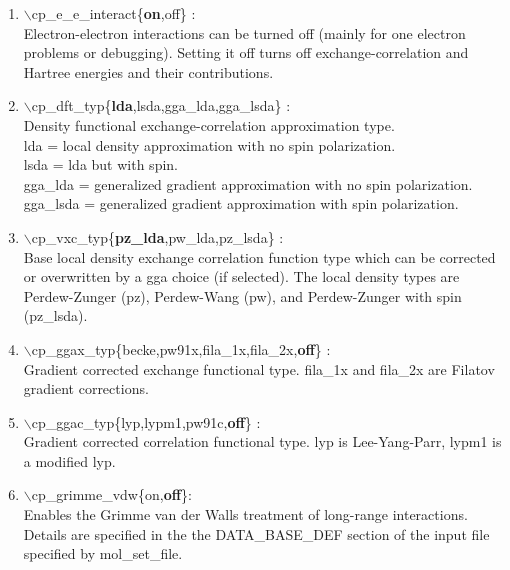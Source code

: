 \documentclass[12pt,titlepage]{article}
\begin{document}
\begin{enumerate}

 \vspace{0.15in} 
 \item  $\backslash$cp\_e\_e\_interact\{{\bf on},off\} : \\
     Electron-electron interactions can be turned off (mainly for  one electron problems or debugging).
     Setting it off turns off exchange-correlation and Hartree energies and their contributions.

 \vspace{0.15in} 
 \item  $\backslash$cp\_dft\_typ\{{\bf lda},lsda,gga\_lda,gga\_lsda\} : \\
     Density functional exchange-correlation approximation type.\\
     lda = local density approximation with no spin polarization.\\
     lsda = lda but with spin.\\
     gga\_lda = generalized gradient approximation with no spin polarization.\\
     gga\_lsda = generalized gradient approximation with  spin polarization.

 \vspace{0.15in} 
 \item  $\backslash$cp\_vxc\_typ\{{\bf pz\_lda},pw\_lda,pz\_lsda\} : \\
     Base local density exchange correlation function type which can be corrected or overwritten by a gga choice (if selected).  The local density types are Perdew-Zunger (pz), Perdew-Wang (pw), and Perdew-Zunger with spin (pz\_lsda).

 \vspace{0.15in} 
 \item  $\backslash$cp\_ggax\_typ\{becke,pw91x,fila\_1x,fila\_2x,{\bf off}\} : \\
     Gradient corrected exchange functional type.  fila\_1x and fila\_2x are Filatov gradient corrections.

 \vspace{0.15in} 
 \item  $\backslash$cp\_ggac\_typ\{lyp,lypm1,pw91c,{\bf off}\} : \\
     Gradient corrected correlation functional type.  lyp is Lee-Yang-Parr, lypm1 is a modified lyp.

 \vspace{0.15in} 
\item $\backslash$cp\_grimme\_vdw\{on,{\bf off}\}:\\
Enables the Grimme van der Walls treatment of long-range interactions.  Details are specified in the the DATA\_BASE\_DEF section of the input file specified by mol\_set\_file.


\end{enumerate}
\end{document}
